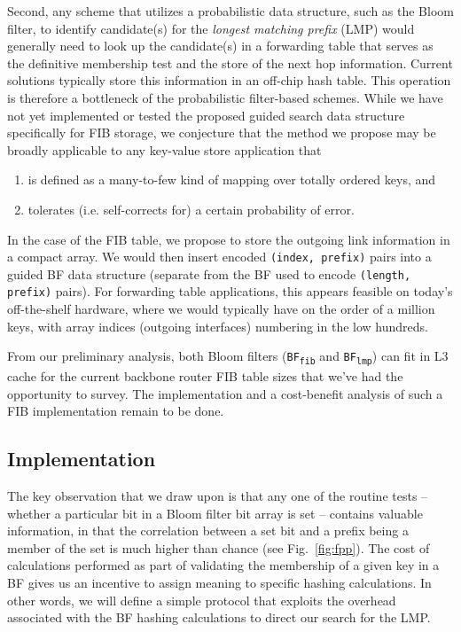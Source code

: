 \documentclass[conference,compsoc]{IEEEtran}
\begin{document}
Second, any scheme that utilizes a probabilistic data structure, such as
the Bloom filter, to identify candidate(s) for the \emph{longest matching
prefix} (LMP) would generally need to look up the candidate(s)
in a forwarding table that serves as the definitive membership
test and the store of the next hop information. Current solutions typically
store this information in an off-chip hash table. This operation is therefore
a bottleneck of the probabilistic filter-based schemes. While we have
not yet implemented or tested the proposed guided search data structure
specifically for FIB storage, we conjecture that the method we propose may be broadly
applicable to any key-value store application that

\begin{enumerate}[label=(\alph*)]
\item is defined as a many-to-few kind of mapping over totally ordered keys, and
\item tolerates (i.e. self-corrects for) a certain probability of error.
\end{enumerate}

In the case of the FIB table, we propose to store the outgoing link information
in a compact array. We would then insert encoded \texttt{(index, prefix)} pairs
into a guided BF data structure (separate from the BF used to
encode \texttt{(length, prefix)} pairs). For forwarding table applications, this appears 
feasible on today's off-the-shelf hardware, where we would typically have 
on the order of a
million keys, with array indices (outgoing interfaces) numbering in the low 
hundreds.

From our preliminary analysis, both Bloom filters (\texttt{BF\textsubscript{fib}}
and \texttt{BF\textsubscript{lmp}}) can fit in L3 cache for the
current backbone router FIB table sizes that we've had the opportunity to
survey. The implementation and a cost-benefit analysis of such a FIB 
implementation remain to be done.


\subsection{Implementation}

The key observation that we draw upon is that any one of the routine
tests -- whether a particular bit in a Bloom filter bit array
is set -- contains valuable information, in that the correlation between
a set bit and a prefix being a member of the set is much higher than chance
(see Fig.~\ref{fig:fpp}). The cost of calculations performed as part of
validating the membership of a given key in a BF gives us an incentive to
assign meaning to specific hashing calculations. In other words, we will 
define a simple protocol that exploits the overhead associated with the
BF hashing calculations to direct our search for the LMP.
\end{document}
